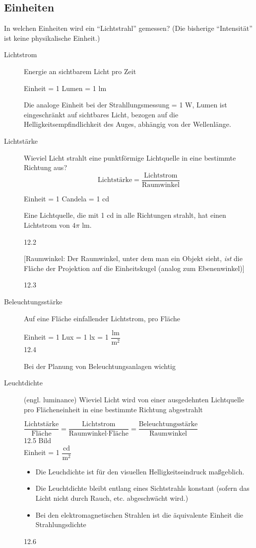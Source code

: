 \subsection{Einheiten}
In welchen Einheiten wird ein "`Lichtstrahl"' gemessen? (Die bisherige "`Intensität"' ist keine physikalische Einheit.)
\begin{description}
 \item[Lichtstrom] Energie an sichtbarem Licht pro Zeit
	\begin{center}
	 Einheit = 1 Lumen = 1 lm
	\end{center}
	Die analoge Einheit bei der Strahllungsmessung = 1 W, Lumen ist eingeschränkt auf sichtbares Licht, bezogen auf
	die Helligkeitsempfindlichkeit des Auges, abhängig von der Wellenlänge.
 \item[Lichtstärke] Wieviel Licht strahlt eine punktförmige Lichtquelle in eine bestimmte Richtung aus?
	\[\text{Lichtstärke} = \frac{\text{Lichtstrom}}{\text{Raumwinkel}}\]
	\begin{center}
	 Einheit = 1 Candela = 1 cd
	\end{center}
	Eine Lichtquelle, die mit 1 cd in alle Richtungen strahlt, hat einen Lichtstrom von $4 \pi$ lm.
	\begin{center}
	 12.2
	\end{center}
	[Raumwinkel: Der Raumwinkel, unter dem man ein Objekt sieht, \emph{ist} die Fläche der Projektion auf die
		Einheitskugel (analog zum Ebenenwinkel)]
	\begin{center}
	 12.3
	\end{center}
 \item[Beleuchtungsstärke] Auf eine Fläche einfallender Lichtstrom, pro Fläche
	\begin{center}
	 Einheit = 1 Lux = 1 lx = 1 $\dfrac{\text{lm}}{\text{m}^2}$\\[1em]
	 12.4
	\end{center}
	Bei der Planung von Beleuchtungsanlagen wichtig
 \item[Leuchtdichte] (engl. luminance) Wieviel Licht wird von einer ausgedehnten Lichtquelle pro Flächeneinheit
	in eine bestimmte Richtung abgestrahlt
	\begin{center}
	 $\dfrac{\text{Lichtstärke}}{\text{Fläche}} = \dfrac{\text{Lichtstrom}}{\text{Raumwinkel} \cdot \text{Fläche}}
	 = \dfrac{\text{Beleuchtungsstärke}}{\text{Raumwinkel}}$\\[1em]
	 12.5
	 Bild\\[1em]
	 Einheit = 1 $\dfrac{\text{cd}}{\text{m}^2}$
	\end{center}
	\begin{itemize}
	\item Die Leuchdichte ist für den visuellen Helligkeitseindruck maßgeblich.
	\item Die Leuchtdichte bleibt entlang eines Sichtstrahls konstant (sofern das Licht nicht durch Rauch, etc.
		abgeschwächt wird.)
	\item Bei den elektromagnetischen Strahlen ist die äquivalente Einheit die Strahlungsdichte
	\end{itemize}
	\begin{center}
	 12.6
	\end{center}
\end{description}


